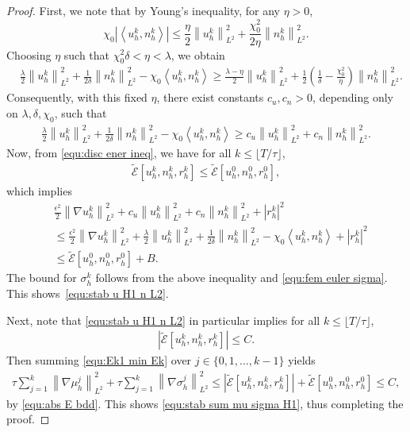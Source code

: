 \documentclass[11pt, reqno]{amsart}
\theoremstyle{definition}
\numberwithin{equation}{section}
\newcommand{\norm}[2]{\left\|{#1}\right\|_{#2}}
\newcommand{\inpro}[2]{\left\langle#1,#2\right\rangle}
\newcommand{\abs}[1]{\left|{#1}\right|}
\begin{document}
\begin{proof}
{First, we note that by Young's inequality, for any $\eta>0$,
\[
\chi_0\abs{\inpro{u_h^k}{n_h^k}}
\le
\frac{\eta}{2}\norm{u_h^k}{L^2}^2
+
\frac{\chi_0^2}{2\eta}\norm{n_h^k}{L^2}^2 .
\]
Choosing $\eta$ such that $\chi_0^2\delta<\eta<\lambda$, we obtain
\begin{align*}
	&\frac{\lambda}{2}\norm{u_h^k}{L^2}^2
	+
	\frac{1}{2\delta}\norm{n_h^k}{L^2}^2
	-
	\chi_0\inpro{u_h^k}{n_h^k}
	\ge
	\frac{\lambda-\eta}{2}\norm{u_h^k}{L^2}^2
	+
	\frac12
	\left(
	\frac{1}{\delta}
	-
	\frac{\chi_0^2}{\eta}
	\right)
	\norm{n_h^k}{L^2}^2 .
\end{align*}
Consequently, with this fixed $\eta$, there exist constants $c_u,c_n>0$, depending only on $\lambda,\delta,\chi_0$, such that
\begin{align}\label{equ:eta ineq}
\frac{\lambda}{2}\norm{u_h^k}{L^2}^2
+
\frac{1}{2\delta}\norm{n_h^k}{L^2}^2
-
\chi_0\inpro{u_h^k}{n_h^k}
\ge
c_u\norm{u_h^k}{L^2}^2
+
c_n\norm{n_h^k}{L^2}^2 .
\end{align}
Now, from \eqref{equ:disc ener ineq}, we have for all $k\leq \lfloor T/\tau \rfloor$,
\begin{align*}
	\widetilde{\mathcal{E}}[u_h^k, n_h^k, r_h^k] \leq \widetilde{\mathcal{E}}[u_h^0, n_h^0, r_h^0],
\end{align*}
which implies
\[
\begin{aligned}
	&\frac{\epsilon^2}{2}\norm{\nabla u_h^k}{L^2}^2
	+
	c_u\norm{u_h^k}{L^2}^2
	+
	c_n\norm{n_h^k}{L^2}^2
	+
	|r_h^k|^2
	\\
	&\leq
	\frac{\epsilon^2}{2} \norm{\nabla u_h^k}{L^2}^2
	+
	\frac{\lambda}{2} \norm{u_h^k}{L^2}^2
	+
	\frac{1}{2\delta} \norm{n_h^k}{L^2}^2
	-
	\chi_0\inpro{u_h^k}{n_h^k}
	+
	|r_h^k|^2
	\\
	&\le
	\widetilde{\mathcal E}[u_h^0,n_h^0,r_h^0]+B.
\end{aligned}
\]
The bound for $\sigma_h^k$ follows from the above inequality and \eqref{equ:fem euler sigma}.
This shows~\eqref{equ:stab u H1 n L2}.}

Next, note that \eqref{equ:stab u H1 n L2} in particular implies for all $k\leq \lfloor T/\tau \rfloor$,
\begin{align}\label{equ:abs E bdd}
	\abs{\widetilde{\mathcal{E}}[u_h^k, n_h^k, r_h^k]} \leq C.
\end{align}
Then summing \eqref{equ:Ek1 min Ek} over $j\in \{0,1,\ldots, k-1\}$ yields
\begin{align*}
	\tau \sum_{j=1}^k \norm{\nabla \mu_h^j}{L^2}^2
	+
	\tau \sum_{j=1}^k \norm{\nabla \sigma_h^j}{L^2}^2
	\leq
	\abs{\widetilde{\mathcal{E}}[u_h^k, n_h^k, r_h^k]} 
	+ \widetilde{\mathcal{E}}[u_h^0, n_h^0, r_h^0]
	\leq C,
\end{align*}
by \eqref{equ:abs E bdd}. This shows \eqref{equ:stab sum mu sigma H1}, thus completing the proof.
\end{proof}
\end{document}
